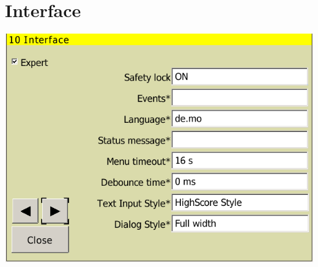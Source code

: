 \documentclass[a4paper,12pt]{refrep}
\begin{document}
\clearpage
\section{Interface}\label{sec:interface}


\begin{center}
\includegraphics[angle=0,width=\linewidth,keepaspectratio='true']{figures/config-8.png}
\end{center}
\end{document}
